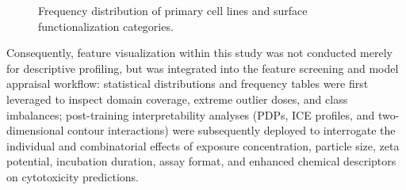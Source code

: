 \begin{figure}[H]
  \centering
  \begin{minipage}{0.49\linewidth}
    \centering
  \end{minipage}
  \hfill
  \begin{minipage}{0.49\linewidth}
    \centering
  \end{minipage}
  \caption{Frequency distribution of primary cell lines and surface functionalization categories.}
  \label{fig:senp-categorical-frequency}
\end{figure}

Consequently, feature visualization within this study was not conducted merely for descriptive profiling, but was integrated into the feature screening and model appraisal workflow: statistical distributions and frequency tables were first leveraged to inspect domain coverage, extreme outlier doses, and class imbalances; post-training interpretability analyses (PDPs, ICE profiles, and two-dimensional contour interactions) were subsequently deployed to interrogate the individual and combinatorial effects of exposure concentration, particle size, zeta potential, incubation duration, assay format, and enhanced chemical descriptors on cytotoxicity predictions.
